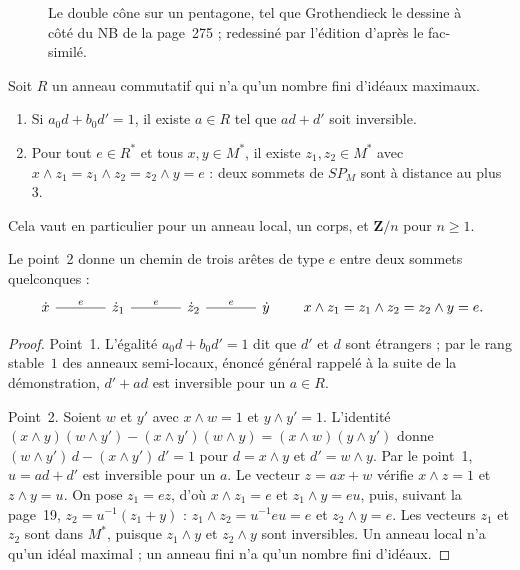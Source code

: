 \begin{figure}[htbp]
\centering
\resizebox{0.35\linewidth}{!}{}
\caption{Le double cône sur un pentagone, tel que Grothendieck le dessine à côté du NB de la page~275 ; redessiné par l'édition d'après le fac-similé.}\label{fig:79-dessin}
\end{figure}

\begin{enonce}
Soit $R$ un anneau commutatif qui n'a qu'un nombre fini d'idéaux maximaux.
\begin{enumerate}
\item Si $a_0d + b_0d' = 1$, il existe $a \in R$ tel que $ad + d'$ soit inversible.
\item Pour tout $e \in R^*$ et tous $x, y \in M^*$, il existe $z_1, z_2 \in M^*$ avec $x \wedge z_1 = z_1 \wedge z_2 = z_2 \wedge y = e$ : deux sommets de $SP_M$ sont à distance au plus~$3$.
\end{enumerate}
Cela vaut en particulier pour un anneau local, un corps, et $\mathbf Z/n$ pour $n \geq 1$.
\end{enonce}

Le point~2 donne un chemin de trois arêtes de type $e$ entre deux sommets quelconques :
\[
\begin{tikzcd}[column sep=large]
\dot x \arrow[r, dash, "e"] & \dot z_1 \arrow[r, dash, "e"] & \dot z_2 \arrow[r, dash, "e"] & \dot y
\end{tikzcd}
\qquad x \wedge z_1 = z_1 \wedge z_2 = z_2 \wedge y = e.
\]

\begin{proof}
Point~1. L'égalité $a_0d + b_0d' = 1$ dit que $d'$ et $d$ sont étrangers ; par le rang stable~$1$ des anneaux semi-locaux, énoncé général rappelé à la suite de la démonstration, $d' + ad$ est inversible pour un $a \in R$.

Point~2. Soient $w$ et $y'$ avec $x \wedge w = 1$ et $y \wedge y' = 1$. L'identité $(x \wedge y)(w \wedge y') - (x \wedge y')(w \wedge y) = (x \wedge w)(y \wedge y')$ donne $(w \wedge y')\,d - (x \wedge y')\,d' = 1$ pour $d = x \wedge y$ et $d' = w \wedge y$. Par le point~1, $u = ad + d'$ est inversible pour un $a$. Le vecteur $z = ax + w$ vérifie $x \wedge z = 1$ et $z \wedge y = u$. On pose $z_1 = ez$, d'où $x \wedge z_1 = e$ et $z_1 \wedge y = eu$, puis, suivant la page~19, $z_2 = u^{-1}(z_1 + y)$ : $z_1 \wedge z_2 = u^{-1}eu = e$ et $z_2 \wedge y = e$. Les vecteurs $z_1$ et $z_2$ sont dans $M^*$, puisque $z_1 \wedge y$ et $z_2 \wedge y$ sont inversibles. Un anneau local n'a qu'un idéal maximal ; un anneau fini n'a qu'un nombre fini d'idéaux.
\end{proof}

